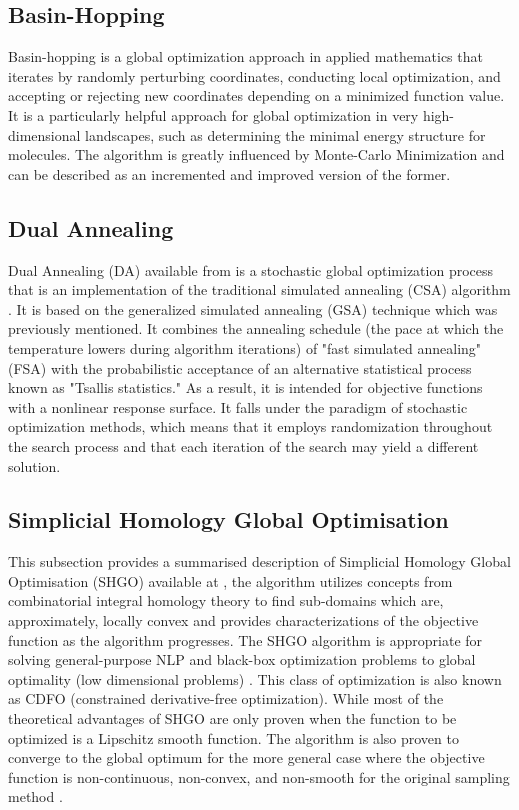 \documentclass[default,iicol]{sn-jnl}
\theoremstyle{thmstyleone}
\theoremstyle{thmstyletwo}
\theoremstyle{thmstylethree}
\begin{document}
 \subsection{Basin-Hopping}\label{subsec12}

Basin-hopping \cite{bib25} is a global optimization approach in applied mathematics that iterates by randomly perturbing coordinates, conducting local optimization, and accepting or rejecting new coordinates depending on a minimized function value. It is a particularly helpful approach for global optimization in very high-dimensional landscapes, such as determining the minimal energy structure for molecules. The algorithm is greatly influenced by Monte-Carlo Minimization \cite{bib26} and can be described as an incremented and improved version of the former.

\subsection{Dual Annealing}\label{subsec13}

Dual Annealing (DA) available from \cite{bib27} is a stochastic global optimization process that is an implementation of the traditional simulated annealing (CSA) algorithm \cite{bib24}. It is based on the generalized simulated annealing (GSA) \cite{bib28} technique which was previously mentioned. It combines the annealing schedule (the pace at which the temperature lowers during algorithm iterations) of "fast simulated annealing" (FSA) with the probabilistic acceptance of an alternative statistical process known as "Tsallis statistics." As a result, it is intended for objective functions with a nonlinear response surface. It falls under the paradigm of stochastic optimization methods, which means that it employs randomization throughout the search process and that each iteration of the search may yield a different solution.

\subsection{Simplicial Homology Global Optimisation}\label{subsec14}

This subsection provides a summarised description of Simplicial Homology Global Optimisation (SHGO) available at \cite{bib27}, the algorithm utilizes concepts from combinatorial integral homology theory to find sub-domains which are, approximately, locally convex and provides characterizations of the objective function as the algorithm progresses. The SHGO algorithm is appropriate for solving general-purpose NLP and black-box optimization problems to global optimality (low dimensional problems) \cite{bib29}. This class of optimization is also known as CDFO (constrained derivative-free optimization). While most of the theoretical advantages of SHGO are only proven when the function to be optimized is a Lipschitz smooth function. The algorithm is also proven to converge to the global optimum for the more general case where the objective function is non-continuous, non-convex, and non-smooth for the original sampling method \cite{bib29}.
\end{document}
